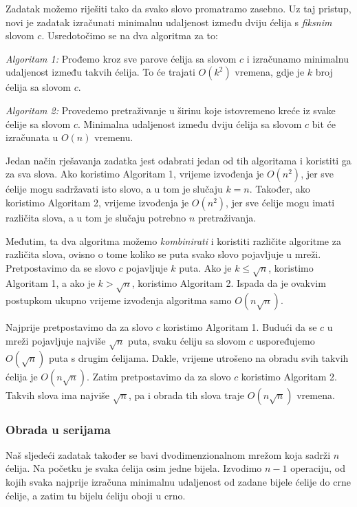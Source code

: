 Zadatak možemo riješiti tako da svako slovo promatramo zasebno.
Uz taj pristup, novi je zadatak izračunati
minimalnu udaljenost
između dviju ćelija s \emph{fiksnim} slovom $c$.
Usredotočimo se na dva algoritma za to:

\emph{Algoritam 1:} Prođemo kroz sve parove ćelija sa slovom $c$
i izračunamo minimalnu udaljenost između takvih ćelija.
To će trajati $O(k^2)$ vremena, gdje je $k$ broj ćelija sa slovom $c$.

\emph{Algoritam 2:} Provedemo pretraživanje u širinu koje istovremeno
kreće iz svake ćelije sa slovom $c$. Minimalna udaljenost između
dviju ćelija sa slovom $c$ bit će izračunata u $O(n)$ vremenu.

Jedan način rješavanja zadatka jest odabrati jedan od
tih algoritama i koristiti ga za sva slova.
Ako koristimo Algoritam 1, vrijeme izvođenja je $O(n^2)$,
jer sve ćelije mogu sadržavati isto slovo,
a u tom je slučaju $k=n$.
Također, ako koristimo Algoritam 2, vrijeme izvođenja je $O(n^2)$,
jer sve ćelije mogu imati različita slova,
a u tom je slučaju potrebno $n$ pretraživanja.

Međutim, ta dva algoritma možemo \emph{kombinirati} i
koristiti različite algoritme za različita slova,
ovisno o tome koliko se puta svako slovo pojavljuje u mreži.
Pretpostavimo da se slovo $c$ pojavljuje $k$ puta.
Ako je $k \le \sqrt n$, koristimo Algoritam 1, a ako je $k > \sqrt n$,
koristimo Algoritam 2.
Ispada da je ovakvim postupkom ukupno vrijeme izvođenja
algoritma samo $O(n \sqrt n)$.

Najprije pretpostavimo da za slovo $c$ koristimo Algoritam 1.
Budući da se $c$ u mreži pojavljuje najviše $\sqrt n$ puta,
svaku ćeliju sa slovom $c$ uspoređujemo $O(\sqrt n)$ puta
s drugim ćelijama.
Dakle, vrijeme utrošeno na obradu svih takvih ćelija je $O(n \sqrt n)$.
Zatim pretpostavimo da za slovo $c$ koristimo Algoritam 2.
Takvih slova ima najviše $\sqrt n$,
pa i obrada tih slova traje $O(n \sqrt n)$ vremena.

\subsubsection{Obrada u serijama}

Naš sljedeći zadatak također se bavi
dvodimenzionalnom mrežom koja sadrži $n$ ćelija.
Na početku je svaka ćelija osim jedne bijela.
Izvodimo $n-1$ operaciju, od kojih svaka najprije
izračuna minimalnu udaljenost od zadane bijele ćelije
do crne ćelije, a zatim tu bijelu ćeliju oboji u crno.


